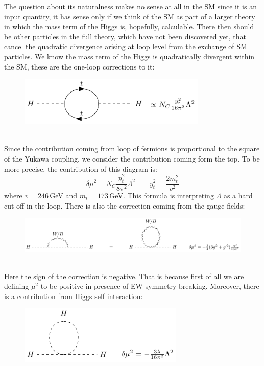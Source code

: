 \documentclass[../main.tex]{subfiles}
\begin{document}
The question about its naturalness makes no sense at all in the SM since it is an input quantity, it has sense only if we think of the SM as part of a larger theory in which the mass term of the Higgs is, hopefully, calculable. There then should be other particles in the full theory, which have not been discovered yet, that cancel the quadratic divergence arising at loop level from the exchange of SM particles. We know the mass term of the Higgs is quadratically divergent within the SM, these are the one-loop corrections to it:
\begin{figure}[h]
    \centering
    \includegraphics[width=0.8\textwidth]{Images/hc1.pdf}
    \caption*{}
\end{figure}\\
Since the contribution coming from loop of fermions is proportional to the square of the Yukawa coupling, we consider the contribution coming form the top. To be more precise, the contribution of this diagram is:
\[
\delta\mu^2=N_C\frac{y_t^2}{8\pi^2}\Lambda^2 \qquad y_t^2=\frac{2m_t^2}{v^2}
\]
where $v=246$\,GeV and $m_t=173$\,GeV. This formula is interpreting $\Lambda$ as a hard cut-off in the loop. There is also the correction coming from the gauge fields:
\begin{figure}[h]
    \centering
    \includegraphics[width=1.5\textwidth]{Images/hc2.pdf}
    \caption*{}
\end{figure}\\
Here the sign of the correction is negative. That is because first of all we are defining $\mu^2$ to be positive in presence of EW symmetry breaking. Moreover, there is a contribution from Higgs self interaction:
\begin{figure}[h]
    \centering
    \includegraphics[width=0.7\textwidth]{Images/hc3.pdf}
    \caption*{}
\end{figure}\\
\end{document}
